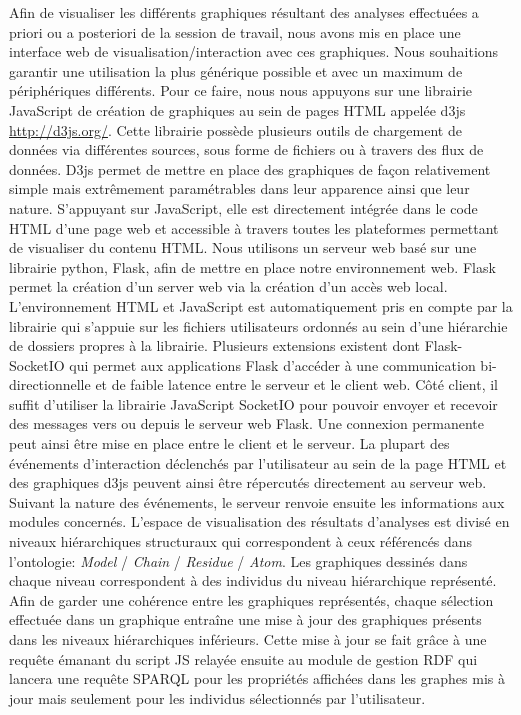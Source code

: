 Afin de visualiser les différents graphiques résultant des analyses effectuées a priori ou a posteriori de la session de travail, nous avons mis en place une interface web de visualisation/interaction avec ces graphiques. Nous souhaitions garantir une utilisation la plus générique possible et avec un maximum de périphériques différents. Pour ce faire, nous nous appuyons sur une librairie JavaScript de création de graphiques au sein de pages HTML appelée d3js \url{http://d3js.org/}. Cette librairie possède plusieurs outils de chargement de données via différentes sources, sous forme de fichiers ou à travers des flux de données. D3js permet de mettre en place des graphiques de façon relativement simple mais extrêmement paramétrables dans leur apparence ainsi que leur nature. S'appuyant sur JavaScript, elle est directement intégrée dans le code HTML d'une page web et accessible à travers toutes les plateformes permettant de visualiser du contenu HTML.
Nous utilisons un serveur web basé sur une librairie python, Flask, afin de mettre en place notre environnement web. Flask permet la création d'un server web via la création d'un accès web local. L'environnement HTML et JavaScript est automatiquement pris en compte par la librairie qui s'appuie sur les fichiers utilisateurs ordonnés au sein d'une hiérarchie de dossiers propres à la librairie. Plusieurs extensions existent dont Flask-SocketIO qui permet aux applications Flask d'accéder à une communication bi-directionnelle et de faible latence entre le serveur et le client web. Côté client, il suffit d'utiliser la librairie JavaScript SocketIO pour pouvoir envoyer et recevoir des messages vers ou depuis le serveur web Flask. Une connexion permanente peut ainsi être mise en place entre le client et le serveur.
La plupart des événements d'interaction déclenchés par l'utilisateur au sein de la page HTML et des graphiques d3js peuvent ainsi être répercutés directement au serveur web. Suivant la nature des événements, le serveur renvoie ensuite les informations aux modules concernés.
L'espace de visualisation des résultats d'analyses est divisé en niveaux hiérarchiques structuraux qui correspondent à ceux référencés dans l'ontologie: \textit{Model} / \textit{Chain} / \textit{Residue} / \textit{Atom}. Les graphiques dessinés dans chaque niveau correspondent à des individus du niveau hiérarchique représenté. Afin de garder une cohérence entre les graphiques représentés, chaque sélection effectuée dans un graphique entraîne une mise à jour des graphiques présents dans les niveaux hiérarchiques inférieurs. Cette mise à jour se fait grâce à une requête émanant du script JS relayée ensuite au module de gestion RDF qui lancera une requête SPARQL pour les propriétés affichées dans les graphes mis à jour mais seulement pour les individus sélectionnés par l'utilisateur.


